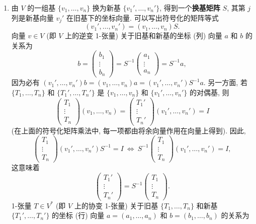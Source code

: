 \begin{enumerate}[label=(\arabic*),leftmargin=*]
\item 由 $V$ 的一组基 $\{v_1,\ldots,v_n\}$ 换为新基 $\{v_1',\ldots,v_n'\}$, 得到一个\textbf{换基矩阵} $S$, 其第 $j$ 列是新基向量 $v_j'$ 在旧基下的坐标向量. 可以写出符号化的矩阵等式
\[
  (v_1',\ldots,v_n')=(v_1,\ldots,v_n)S.
\]
向量 $v\in V$ (即 $V$ 上的逆变 1-张量) 关于旧基和新基的坐标 (列) 向量 $a$ 和 $b$ 的关系为
\[
  b=\begin{pmatrix}b_1\\\vdots\\b_n\end{pmatrix}
  =S^{-1}\begin{pmatrix}a_1\\\vdots\\a_n\end{pmatrix}=S^{-1}a,
\]
因为必有 $(v_1',\ldots,v_n')b=(v_1,\ldots,v_n)a=(v_1',\ldots,v_n')S^{-1}a$. 另一方面, 若 $\{T_1,\ldots,T_n\}$ 和 $\{T_1',\ldots,T_n'\}$ 是 $\{v_1,\ldots,v_n\}$ 和 $\{v_1',\ldots,v_n'\}$ 的对偶基, 则
\[
  \begin{pmatrix}T_1\\\vdots\\T_n\end{pmatrix}(v_1,\ldots,v_n)
  =\begin{pmatrix}T_1'\\\vdots\\T_n'\end{pmatrix}(v_1',\ldots,v_n')=I
\]
(在上面的符号化矩阵乘法中, 每一项都由将余向量作用在向量上得到). 因此,
\[
  \begin{pmatrix}T_1\\\vdots\\T_n\end{pmatrix}(v_1',\ldots,v_n')S^{-1}=I
  \ \Leftrightarrow\
  S^{-1}\begin{pmatrix}T_1\\\vdots\\T_n\end{pmatrix}(v_1',\ldots,v_n')=I,
\]
这意味着
\[
  \begin{pmatrix}T_1'\\\vdots\\T_n'\end{pmatrix}=S^{-1}
  \begin{pmatrix}T_1\\\vdots\\T_n\end{pmatrix}.
\]
1-张量 $T\in V^*$ (即 $V$ 上的协变 1-张量) 关于旧基 $\{T_1,\ldots,T_n\}$ 和新基 $\{T_1',\ldots,T_n'\}$ 的坐标 (行) 向量 $a=(a_1,\ldots,a_n)$ 和 $b=(b_1,\ldots,b_n)$ 的关系为

\end{enumerate}
